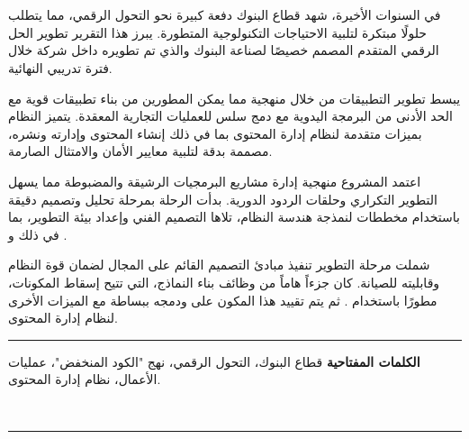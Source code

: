 
\chapter*{}

\begin{RLtext}
في السنوات الأخيرة، شهد قطاع البنوك دفعة كبيرة نحو التحول الرقمي، مما يتطلب حلولًا مبتكرة لتلبية الاحتياجات التكنولوجية المتطورة. يبرز هذا التقرير تطوير  الحل الرقمي المتقدم المصمم خصيصًا لصناعة البنوك والذي تم تطويره داخل شركة  خلال فترة تدريبي النهائية.

يبسط  تطوير التطبيقات من خلال منهجية  مما يمكن المطورين من بناء تطبيقات قوية مع الحد الأدنى من البرمجة اليدوية مع دمج سلس للعمليات التجارية المعقدة. يتميز النظام بميزات متقدمة لنظام إدارة المحتوى  بما في ذلك إنشاء المحتوى وإدارته ونشره، مصممة بدقة لتلبية معايير الأمان والامتثال الصارمة.

اعتمد المشروع منهجية إدارة مشاريع البرمجيات الرشيقة والمضبوطة  مما يسهل التطوير التكراري وحلقات الردود الدورية. بدأت الرحلة بمرحلة تحليل وتصميم دقيقة باستخدام مخططات  لنمذجة هندسة النظام، تلاها التصميم الفني وإعداد بيئة التطوير، بما في ذلك  و .

شملت مرحلة التطوير تنفيذ مبادئ التصميم القائم على المجال  لضمان قوة النظام وقابليته للصيانة. كان جزءاً هاماً من وظائف بناء النماذج، التي تتيح إسقاط المكونات، مطورًا باستخدام . ثم يتم تقييد هذا المكون على  ودمجه ببساطة مع الميزات الأخرى لنظام إدارة المحتوى.


\end{RLtext}

\noindent\rule[2pt]{\textwidth}{0.5pt}

\begin{RLtext} 

{\textbf{الكلمات المفتاحية}}
 قطاع البنوك، التحول الرقمي، نهج "الكود المنخفض"، عمليات الأعمال، نظام إدارة المحتوى.

\\

\end{RLtext}

\noindent\rule[2pt]{\textwidth}{0.5pt}